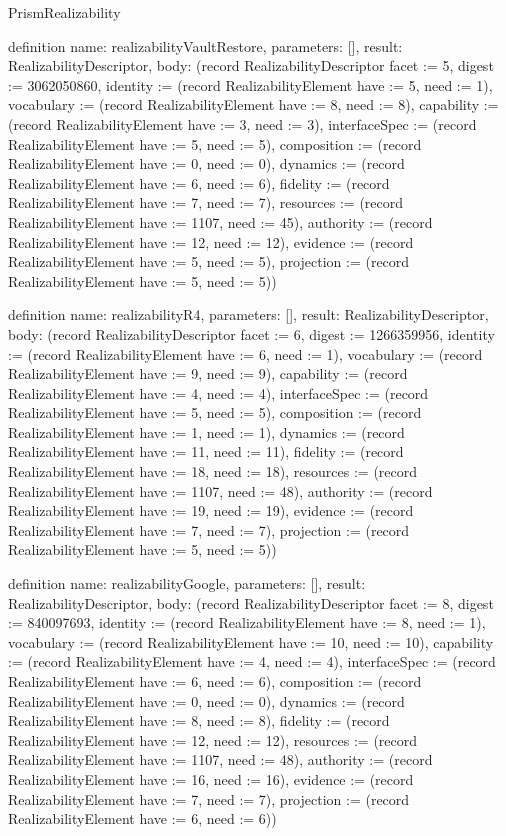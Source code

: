 \begin{lexlean}{PrismRealizability}
\begin{semanticmodule}
definition{
  name: realizabilityVaultRestore,
  parameters: [],
  result: RealizabilityDescriptor,
  body: (record RealizabilityDescriptor {facet := 5, digest := 3062050860, identity := (record RealizabilityElement {have := 5, need := 1}), vocabulary := (record RealizabilityElement {have := 8, need := 8}), capability := (record RealizabilityElement {have := 3, need := 3}), interfaceSpec := (record RealizabilityElement {have := 5, need := 5}), composition := (record RealizabilityElement {have := 0, need := 0}), dynamics := (record RealizabilityElement {have := 6, need := 6}), fidelity := (record RealizabilityElement {have := 7, need := 7}), resources := (record RealizabilityElement {have := 1107, need := 45}), authority := (record RealizabilityElement {have := 12, need := 12}), evidence := (record RealizabilityElement {have := 5, need := 5}), projection := (record RealizabilityElement {have := 5, need := 5})})
}

definition{
  name: realizabilityR4,
  parameters: [],
  result: RealizabilityDescriptor,
  body: (record RealizabilityDescriptor {facet := 6, digest := 1266359956, identity := (record RealizabilityElement {have := 6, need := 1}), vocabulary := (record RealizabilityElement {have := 9, need := 9}), capability := (record RealizabilityElement {have := 4, need := 4}), interfaceSpec := (record RealizabilityElement {have := 5, need := 5}), composition := (record RealizabilityElement {have := 1, need := 1}), dynamics := (record RealizabilityElement {have := 11, need := 11}), fidelity := (record RealizabilityElement {have := 18, need := 18}), resources := (record RealizabilityElement {have := 1107, need := 48}), authority := (record RealizabilityElement {have := 19, need := 19}), evidence := (record RealizabilityElement {have := 7, need := 7}), projection := (record RealizabilityElement {have := 5, need := 5})})
}

definition{
  name: realizabilityGoogle,
  parameters: [],
  result: RealizabilityDescriptor,
  body: (record RealizabilityDescriptor {facet := 8, digest := 840097693, identity := (record RealizabilityElement {have := 8, need := 1}), vocabulary := (record RealizabilityElement {have := 10, need := 10}), capability := (record RealizabilityElement {have := 4, need := 4}), interfaceSpec := (record RealizabilityElement {have := 6, need := 6}), composition := (record RealizabilityElement {have := 0, need := 0}), dynamics := (record RealizabilityElement {have := 8, need := 8}), fidelity := (record RealizabilityElement {have := 12, need := 12}), resources := (record RealizabilityElement {have := 1107, need := 48}), authority := (record RealizabilityElement {have := 16, need := 16}), evidence := (record RealizabilityElement {have := 7, need := 7}), projection := (record RealizabilityElement {have := 6, need := 6})})
}


\end{semanticmodule}
\end{lexlean}
